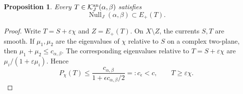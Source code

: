 \documentclass[reqno]{amsart}
\theoremstyle{remark}
\newcommand{\JNull}{\operatorname{Null}_{J}}
\theoremstyle{plain}
\newtheorem{prop}[thm]{Proposition}
\begin{document}
\begin{prop}\label{prop:easy-direction}
Every
$T\in\mathcal K^{\rm an}_J(\alpha,\beta)$ satisfies
\[
 \JNull(\alpha,\beta)\subset E_+(T).
\]
\end{prop}
\begin{proof}
Write $T=S+\varepsilon\chi$ and $Z=E_+(T)$.  On
$X\setminus Z$, the currents $S,T$ are smooth.  If
$\mu_1,\mu_2$ are the eigenvalues of $\chi$ relative to $S$ on a
complex two-plane, then $\mu_1+\mu_2\leq c_{\alpha,\beta}.$ 
The corresponding eigenvalues relative to
$T=S+\varepsilon\chi$ are
$\mu_i/(1+\varepsilon\mu_i)$.  Hence
\begin{equation}\label{eq:margin}
 P_\chi(T)\leq \frac{c_{\alpha,\beta}}{1+\epsilon c_{\alpha,\beta}/2}=:c_\epsilon<c,\qquad T\geq\varepsilon\chi.
\end{equation}


\end{proof}
\end{document}
